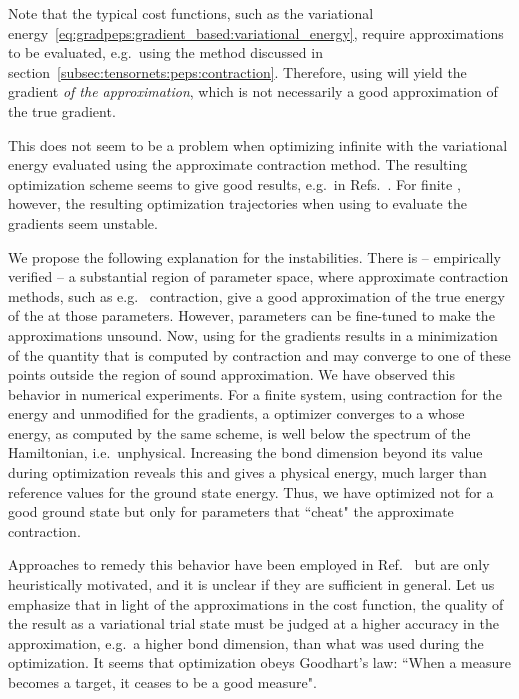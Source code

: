 Note that the typical cost functions, such as the variational energy~\eqref{eq:gradpeps:gradient_based:variational_energy}, require approximations to be evaluated, e.g.~using the  method discussed in section~\ref{subsec:tensornets:peps:contraction}.
%
Therefore, using  will yield the gradient \emph{of the approximation}, which is not necessarily a good approximation of the true gradient.



This does not seem to be a problem when optimizing infinite  with the variational energy evaluated using the  approximate contraction method.
%
The resulting optimization scheme seems to give good results, e.g.~in Refs.~\cite{hasik2021}.
%
For finite , however, the resulting optimization trajectories when using  to evaluate the gradients seem unstable.



We propose the following explanation for the instabilities.
%
There is -- empirically verified -- a substantial region of parameter space, where approximate contraction methods, such as e.g.~ contraction, give a good approximation of the true energy of the  at those parameters.
%
However, parameters can be fine-tuned to make the approximations unsound.
%
Now, using  for the gradients results in a minimization of the quantity that is computed by  contraction and may converge to one of these points outside the region of sound approximation.
%
We have observed this behavior in numerical experiments.
%
For a finite system, using  contraction for the energy and unmodified  for the gradients, a  optimizer converges to a  whose energy, as computed by the same  scheme, is well below the spectrum of the Hamiltonian, i.e.~unphysical.
%
Increasing the  bond dimension beyond its value during optimization reveals this and gives a physical energy, much larger than  reference values for the ground state energy.
%
Thus, we have optimized not for a good ground state but only for parameters that ``cheat" the approximate contraction.



Approaches to remedy this behavior have been employed in Ref.~\cite{orourke2023} but are only heuristically motivated, and it is unclear if they are sufficient in general.
%
Let us emphasize that in light of the approximations in the cost function, the quality of the result as a variational trial state must be judged at a higher accuracy in the approximation, e.g.~a higher  bond dimension, than what was used during the optimization.
%
It seems that  optimization obeys Goodhart's law: ``When a measure becomes a target, it ceases to be a good measure"\cite{strathern1997improving}.



